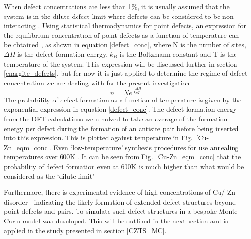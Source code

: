 \documentclass[11pt, twoside]{report}
\begin{document}
When defect concentrations are less than 1\%, it is usually assumed that the system is in the dilute defect limit where defects can be considered to be non-interacting \cite{Stoneham_defect_lim}. Using statistical thermodynamics for point defects, an expression for the equilibrium concentration of point defects as a function of temperature can be obtained \cite{thermodynamics}, as shown in equation \ref{defect_conc}, where N is the number of sites, $\Delta H$ is the defect formation energy, $k_B$ is the Boltzmann constant and T is the temperature of the system. This expression will be discussed further in section \ref{enargite_defects}, but for now it is just applied to determine the regime of defect concentration we are dealing with for the present investigation.
\begin{equation} \label{defect_conc}
n = Ne^{\frac{-\Delta H}{k_BT}}
\end{equation}
The probability of defect formation as a function of temperature is given by the exponential expression in equation \ref{defect_conc}. The defect formation energy from the DFT calculations were halved to take an average of the formation energy per defect during the formation of an antisite pair before being inserted into this expression. This is plotted against temperature in Fig.~\ref{Cu-Zn_eqm_conc}. 
Even `low-temperature' synthesis procedures for {\CZTS} use annealing temperatures over 600K \cite{low_T_CZTS}. It can be seen from Fig.~\ref{Cu-Zn_eqm_conc} that the probability of defect formation even at 600K is much higher than what would be considered as the `dilute limit'.

Furthermore, there is experimental evidence of high concentrations of Cu/ Zn disorder \cite{Scragg, pot_fluc_4, neutron, Schorr}, indicating the likely formation of extended defect structures beyond point defects and pairs. To simulate such defect structures in {\CZTS} a bespoke Monte Carlo model was developed. This will be outlined in the next section and is applied in the study presented in section \ref{CZTS_MC}.
\end{document}
